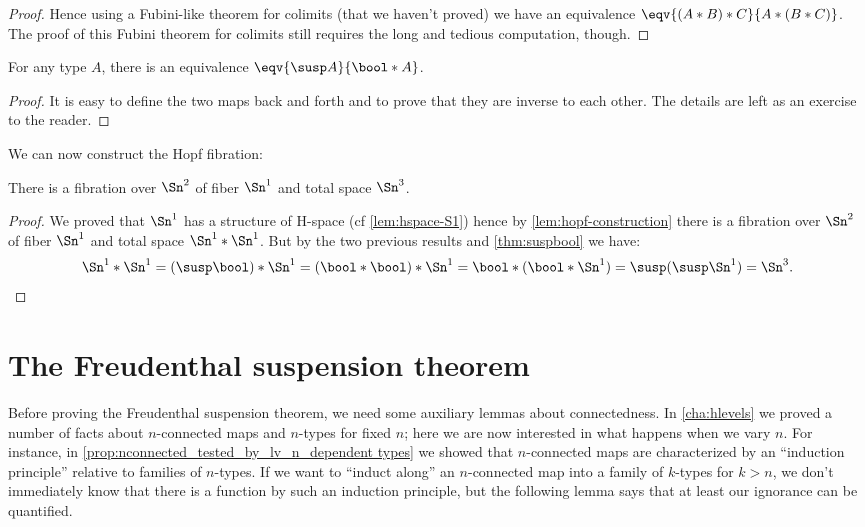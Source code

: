 {\begin{proof}
  Hence using a Fubini-like theorem for colimits (that we haven’t proved) we
  have an equivalence $\eqv{(A*B)*C}{A*(B*C)}$. The proof of this Fubini theorem
  for colimits still requires the long and tedious computation, though.
\end{proof}

\begin{lem}
  For any type $A$, there is an equivalence $\eqv{\susp A}{\bool*A}$.
\end{lem}

\begin{proof}
  It is easy to define the two maps back and forth and to prove that they are
  inverse to each other. The details are left as an exercise to the reader.
\end{proof}

We can now construct the Hopf fibration:

\begin{thm}
  There is a fibration over $\Sn^2$ of fiber $\Sn^1$ and total space $\Sn^3$.
\end{thm}
\begin{proof}
  We proved that $\Sn^1$ has a structure of H-space (cf \cref{lem:hspace-S1})
  hence by \cref{lem:hopf-construction} there is a fibration over $\Sn^2$ of
  fiber $\Sn^1$ and total space $\Sn^1*\Sn^1$. But by the two previous results
  and \cref{thm:suspbool} we have:
  \begin{equation*}
    \Sn^1*\Sn^1 = (\susp\bool)*\Sn^1
    =(\bool*\bool)*\Sn^1
    =\bool*(\bool*\Sn^1)
    =\susp(\susp\Sn^1)
    =\Sn^3. \qedhere
  \end{equation*}
\end{proof}

\section{The Freudenthal suspension theorem}
\label{sec:freudenthal}

%
%

Before proving the Freudenthal suspension theorem, we need some auxiliary lemmas about connectedness.
In \cref{cha:hlevels} we proved a number of facts about $n$-connected maps and $n$-types for fixed $n$; here we are now interested in what happens when we vary $n$.
For instance, in \cref{prop:nconnected_tested_by_lv_n_dependent types} we showed that $n$-connected maps are characterized by an ``induction principle'' relative to families of $n$-types.
If we want to ``induct along'' an $n$-connected map into a family of $k$-types for $k> n$, we don't immediately know that there is a function by such an induction principle, but the following lemma says that at least our ignorance can be quantified.

}
